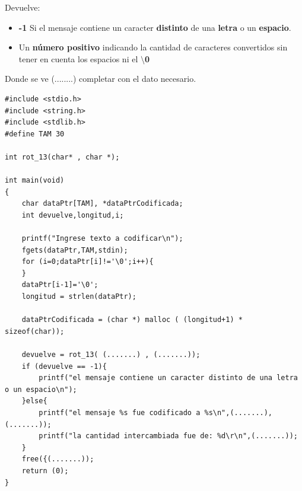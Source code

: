\documentclass[12pt]{article} %
\begin{document}
\begin{enumerate}
Devuelve:
\begin{itemize}
\item {\bf -1} Si el mensaje contiene un caracter {\bf distinto} de una {\bf letra} o un {\bf espacio}.
\item Un {\bf número positivo} indicando la cantidad de caracteres convertidos sin tener en 
cuenta los espacios ni el {\bf $\setminus$0}
\end{itemize}
\end{enumerate}

\newpage

Donde se ve  {\color{red}(........)}  completar con el dato necesario.\\ 
 \begin{lstlisting}
#include <stdio.h>
#include <string.h>
#include <stdlib.h>
#define TAM 30

int rot_13(char* , char *);        

int main(void)
{
    char dataPtr[TAM], *dataPtrCodificada;        
    int devuelve,longitud,i;

    printf("Ingrese texto a codificar\n");
    fgets(dataPtr,TAM,stdin);
    for (i=0;dataPtr[i]!='\0';i++){     
    }
    dataPtr[i-1]='\0';                  
    longitud = strlen(dataPtr);         

    dataPtrCodificada = (char *) malloc ( (longitud+1) * sizeof(char)); 

    devuelve = rot_13( (.......) , (.......));         
    if (devuelve == -1){
        printf("el mensaje contiene un caracter distinto de una letra o un espacio\n");
    }else{
        printf("el mensaje %s fue codificado a %s\n",(.......), (.......));
        printf("la cantidad intercambiada fue de: %d\r\n",(.......));
    }
    free({(.......));
    return (0);
}
   \end{lstlisting}
 
\end{document}
